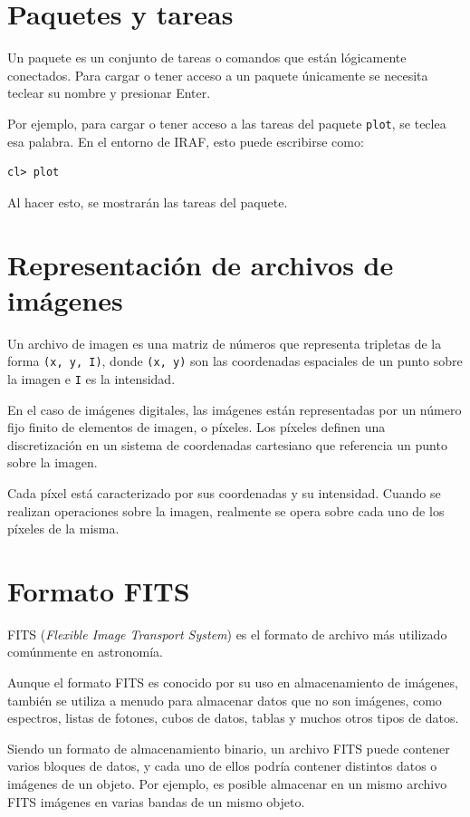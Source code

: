 \section{Paquetes y tareas}

Un paquete es un conjunto de tareas o comandos que están lógicamente conectados. Para cargar o tener acceso a un paquete únicamente se necesita teclear su nombre y presionar Enter.

Por ejemplo, para cargar o tener acceso a las tareas del paquete \texttt{plot}, se teclea esa palabra. En el entorno de IRAF, esto puede escribirse como:

\begin{verbatim}
cl> plot
\end{verbatim}

Al hacer esto, se mostrarán las tareas del paquete.

\section{Representación de archivos de imágenes}

Un archivo de imagen es una matriz de números que representa tripletas de la forma \texttt{(x, y, I)}, donde \texttt{(x, y)} son las coordenadas espaciales de un punto sobre la imagen e \texttt{I} es la intensidad.

En el caso de imágenes digitales, las imágenes están representadas por un número fijo finito de elementos de imagen, o píxeles. Los píxeles definen una discretización en un sistema de coordenadas cartesiano que referencia un punto sobre la imagen.

Cada píxel está caracterizado por sus coordenadas y su intensidad. Cuando se realizan operaciones sobre la imagen, realmente se opera sobre cada uno de los píxeles de la misma.

\section{Formato FITS}

FITS (\textit{Flexible Image Transport System}) es el formato de archivo más utilizado comúnmente en astronomía.

Aunque el formato FITS es conocido por su uso en almacenamiento de imágenes, también se utiliza a menudo para almacenar datos que no son imágenes, como espectros, listas de fotones, cubos de datos, tablas y muchos otros tipos de datos.

Siendo un formato de almacenamiento binario, un archivo FITS puede contener varios bloques de datos, y cada uno de ellos podría contener distintos datos o imágenes de un objeto. Por ejemplo, es posible almacenar en un mismo archivo FITS imágenes en varias bandas de un mismo objeto.

